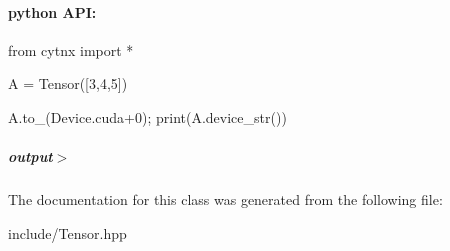 \begin{DoxyVerbInclude}
\end{DoxyVerbInclude}
 \paragraph*{python A\+PI\+:}


\begin{DoxyCodeInclude}
\textcolor{keyword}{from} cytnx \textcolor{keyword}{import} *

A = Tensor([3,4,5])

A.to\_(Device.cuda+0);
print(A.device\_str())

\end{DoxyCodeInclude}
 \subparagraph*{output$>$}


\begin{DoxyVerbInclude}
\end{DoxyVerbInclude}
 

The documentation for this class was generated from the following file\+:\begin{DoxyCompactItemize}
\item 
include/Tensor.\+hpp\end{DoxyCompactItemize}

